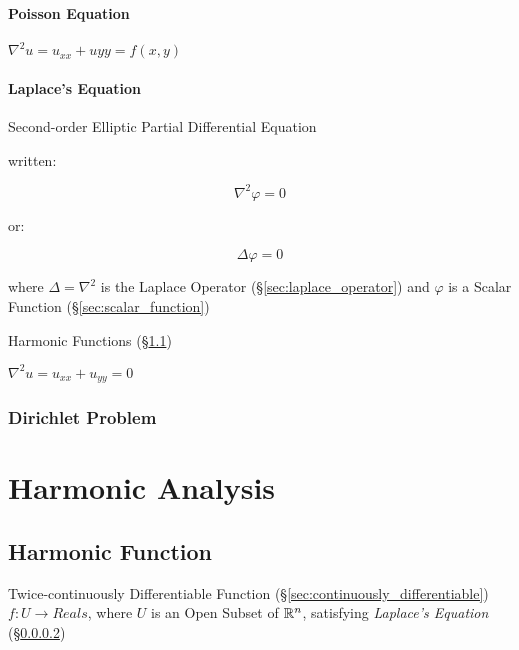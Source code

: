 \paragraph{Poisson Equation}\label{sec:poisson_equation}\hfill

$\nabla^2 u = u_{xx} + u{yy} = f(x,y)$



\paragraph{Laplace's Equation}\label{sec:laplaces_equation}\hfill

Second-order Elliptic Partial Differential Equation

written:

\[ \nabla^2 \varphi = 0 \]

or:

\[ \Delta \varphi = 0 \]

where $\Delta = \nabla^2$ is the Laplace Operator
(\S\ref{sec:laplace_operator}) and $\varphi$ is a Scalar Function
(\S\ref{sec:scalar_function})

Harmonic Functions (\S\ref{sec:harmonic_function})

$\nabla^2 u = u_{xx} + u_{yy} = 0$ %



\subsubsection{Dirichlet Problem}\label{sec:dirichlet_problem}






\section{Harmonic Analysis}\label{sec:harmonic_analysis}

\subsection{Harmonic Function}\label{sec:harmonic_function}

Twice-continuously Differentiable Function
(\S\ref{sec:continuously_differentiable}) $f : U \rightarrow Reals$,
where $U$ is an Open Subset of $\mathbb{R}^n$, satisfying \emph{Laplace's
  Equation} (\S\ref{sec:laplaces_equation})

